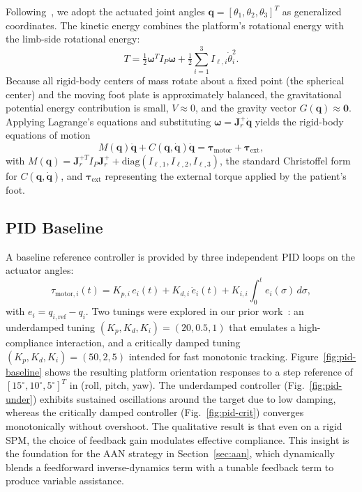 \documentclass[conference]{IEEEtran}
\begin{document}
Following~\cite{zhang2025rehab}, we adopt the actuated joint angles $\boldsymbol{q}=[\theta_1,\theta_2,\theta_3]^{\!T}$ as generalized coordinates. The kinetic energy combines the platform's rotational energy with the limb-side rotational energy:
\begin{equation}
T=\tfrac{1}{2}\boldsymbol{\omega}^{\!T}I_P\boldsymbol{\omega}+\tfrac{1}{2}\sum_{i=1}^3 I_{\ell,i}\dot{\theta}_i^2.
\end{equation}
Because all rigid-body centers of mass rotate about a fixed point (the spherical center) and the moving foot plate is approximately balanced, the gravitational potential energy contribution is small, $V\approx 0$, and the gravity vector $G(\boldsymbol{q})\approx\mathbf{0}$. Applying Lagrange's equations and substituting $\boldsymbol{\omega}=\mathbf{J}_r^{+}\dot{\boldsymbol{q}}$ yields the rigid-body equations of motion
\begin{equation}
M(\boldsymbol{q})\ddot{\boldsymbol{q}}+C(\boldsymbol{q},\dot{\boldsymbol{q}})\dot{\boldsymbol{q}}=\boldsymbol{\tau}_{\mathrm{motor}}+\boldsymbol{\tau}_{\mathrm{ext}},
\label{eq:dynamics}
\end{equation}
with $M(\boldsymbol{q})=\mathbf{J}_r^{+T}I_P\mathbf{J}_r^{+}+\mathrm{diag}(I_{\ell,1},I_{\ell,2},I_{\ell,3})$, the standard Christoffel form for $C(\boldsymbol{q},\dot{\boldsymbol{q}})$, and $\boldsymbol{\tau}_{\mathrm{ext}}$ representing the external torque applied by the patient's foot.

\subsection{PID Baseline}

A baseline reference controller is provided by three independent PID loops on the actuator angles:
\begin{equation}
\tau_{\mathrm{motor},i}(t)=K_{p,i}\,e_i(t)+K_{d,i}\,\dot{e}_i(t)+K_{i,i}\!\int_0^t\!e_i(\sigma)\,d\sigma,
\label{eq:pid}
\end{equation}
with $e_i=q_{i,\mathrm{ref}}-q_i$. Two tunings were explored in our prior work~\cite{zhang2025rehab}: an underdamped tuning $(K_p,K_d,K_i)=(20,0.5,1)$ that emulates a high-compliance interaction, and a critically damped tuning $(K_p,K_d,K_i)=(50,2,5)$ intended for fast monotonic tracking. Figure~\ref{fig:pid-baseline} shows the resulting platform orientation responses to a step reference of $[15^{\circ},10^{\circ},5^{\circ}]^{\!T}$ in (roll, pitch, yaw). The underdamped controller (Fig.~\ref{fig:pid-under}) exhibits sustained oscillations around the target due to low damping, whereas the critically damped controller (Fig.~\ref{fig:pid-crit}) converges monotonically without overshoot. The qualitative result is that even on a rigid SPM, the choice of feedback gain modulates effective compliance. This insight is the foundation for the AAN strategy in Section~\ref{sec:aan}, which dynamically blends a feedforward inverse-dynamics term with a tunable feedback term to produce variable assistance.
\end{document}
